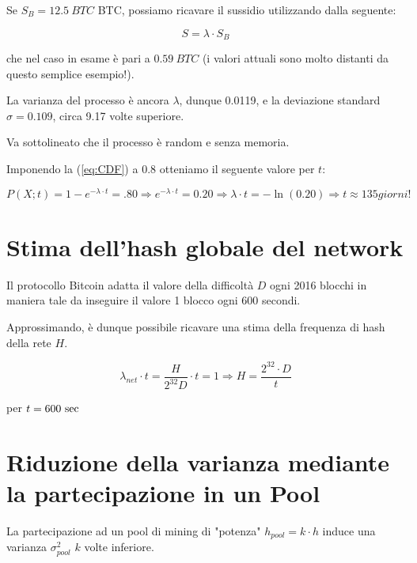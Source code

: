 \documentclass{article}
\begin{document}
Se $S_{B} = 12.5 \ BTC$ BTC, possiamo ricavare il sussidio utilizzando dalla seguente:

\begin{equation}
    S = \lambda \cdot S_{B} \label{eq:lamdaToSubside}
\end{equation}

che nel caso in esame è pari a $0.59 \ BTC$ (i valori attuali sono molto distanti da questo semplice esempio!).

La varianza del processo è ancora $\lambda$, dunque 0.0119, e la deviazione standard $\sigma = 0.109$, circa 9.17 volte superiore.

Va sottolineato che il processo è random e senza memoria.

Imponendo la (\ref{eq:CDF}) a 0.8 otteniamo il seguente valore per $t$:

\begin{equation}
    P(X; t) = 1 - e^{-\lambda \cdot t} = .80 \Rightarrow  e^{-\lambda \cdot t} = 0.20 \Rightarrow  {\lambda \cdot t} = -\ln(0.20) \Rightarrow t \approx 135 \textit{giorni!} 
\end{equation}

\section{Stima dell'hash globale del network} \label{stima_hash_growth}

Il protocollo Bitcoin adatta il valore della difficoltà $D$ ogni 2016 blocchi in maniera tale da inseguire il valore 1 blocco ogni 600 secondi.

Approssimando, è dunque possibile ricavare una stima della frequenza di hash della rete $H$.

\begin{equation}
    \lambda_{net} \cdot t = \frac{H}{2^{32}D} \cdot t = 1 \Rightarrow H = \frac{2^{32} \cdot D}{t} \label{lamda_net}
\end{equation}

per $t = 600 \ \textnormal{sec}$

\section{Riduzione della varianza mediante la partecipazione in un Pool}

La partecipazione ad un pool di mining di "potenza" $h_{\textit{pool}} = k \cdot h$ induce una varianza $\sigma_{\textit{pool}}^{2}$ $k$ volte inferiore.
\end{document}
